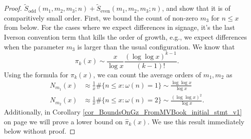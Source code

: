 \documentclass[11pt,reqno,a4letter]{article}
\numberwithin{figure}{section}
\numberwithin{table}{section}
\theoremstyle{plain}
\numberwithin{theorem}{section}
\theoremstyle{definition}
\begin{document}
\begin{proof}
$\widetilde{S}_{\operatorname{odd}}(m_1, m_2, m_3; n) + \widetilde{S}_{\operatorname{even}}(m_1, m_2, m_3; n)$, 
and show that it is of comparitively small order. First, we bound the count of non-zero $m_3$ for 
$n \leq x$ from below. 
For the cases where we expect differences in 
signage, it's the last Iverson convention term that kills the order of growth, e.g., we expect differences 
when the parameter $m_3$ is larger than the usual configuration. 
We know that 
\[
\pi_k(x) \sim \frac{x}{\log x} \frac{(\log\log x)^{k-1}}{(k-1)!}. 
\]
Using the formula for $\pi_k(x)$, we can count the average orders of $m_1,m_2$ as 
\begin{align*}
N_{m_1}(x) & \approx \frac{1}{x} \#\{n \leq x: \omega(n) = 1\} \sim \frac{\log\log x}{\log x} \\ 
N_{m_2}(x) & \approx \frac{1}{x} \#\{n \leq x: \omega(n) = 2\} \sim \frac{(\log\log x)^2}{\log x}. 
\end{align*} 
Additionally, in Corollary \ref{cor_BoundsOnGz_FromMVBook_initial_stmt_v1} on 
page \pageref{cor_BoundsOnGz_FromMVBook_initial_stmt_v1} 
we will prove a lower bound on $\widehat{\pi}_k(x)$. We use this result immediately 
below without proof. 


\end{proof}
\end{document}
